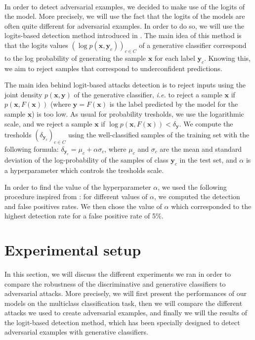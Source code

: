 \documentclass[11pt,twocolumn,letterpaper]{article}
\begin{document}
\paragraph{} In order to detect adversarial examples, we decided to make use of the logits of the model. More precisely, we will use the fact that the logits of the models are often quite different for adversarial examples. In order to do so, we will use the logits-based detection method introduced in \cite{main_paper}. The main idea of this method is that the logits values $(\log{p(\bm{x}, \bm{y}_c)})_{c \in C}$ of a generative classifier correspond to the log probability of generating the sample $\bm{x}$ for each label $\bm{y}_c$. Knowing this, we aim to reject samples that correspond to underconfident predictions. 

The main idea behind logit-based attacks detection is to reject inputs using the joint density $p(\bm{x}, \bm{y})$ of the generative classifier, \textit{i.e.} to reject a sample $\bm{x}$ if $p(\bm{x}, F(\bm{x}))$ (where $\bm{y} = F(\bm{x})$ is the label predicted by the model for the sample $\bm{x}$) is too low. As usual for probability tresholds, we use the logarithmic scale, and we reject a sample $\bm{x}$ if $\log{p(\bm{x}, F(\bm{x}))} < \delta_{\bm{y}}$. We compute the tresholds $(\delta_{\bm{y}_c})_{c \in C}$ using the well-classified samples of the training set with the following formula: $\delta_{\bm{y}_c} = \mu_c + \alpha \sigma_c$, where $\mu_c$ and $\sigma_c$ are the mean and standard deviation of the log-probability of the samples of class $\bm{y}_c$ in the test set, and $\alpha$ is a hyperparameter which controls the tresholds scale.

In order to find the value of the hyperparameter $\alpha$, we used the following procedure inspired from \cite{main_paper}: for different values of $\alpha$, we computed the detection and false positives rates. We then chose the value of $\alpha$ which corresponded to the highest detection rate for a false positive rate of 5\%.

\section{Experimental setup}
\label{sec:setup}

\paragraph{} In this section, we will discuss the different experiments we ran in order to compare the robustness of the discriminative and generative classifiers to adversarial attacks. More precisely, we will first present the performances of our models on the multiclass classification task, then we will compare the different attacks we used to create adversarial examples, and finally we will the results of the logit-based detection method, which has been specially designed to detect adversarial examples with generative classifiers. 
\end{document}
